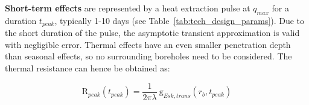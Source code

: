\textbf{Short-term effects} are represented by a heat extraction pulse at $q_{max}$ for a duration $t_{peak}$, typically 1-10 days (see Table~\ref{tab:tech_design_params}). Due to the short duration of the pulse, the asymptotic transient approximation is valid with negligible error. Thermal effects have an even smaller penetration depth than seasonal effects, so no surrounding boreholes need to be considered. The thermal resistance can hence be obtained as:

\begin{equation}
    \mathrm{R}_{peak}(t_{peak}) = \frac{1}{2 \pi \lambda} \ \mathrm{g}_{Esk, trans}(r_b, t_{peak})
\end{equation}


